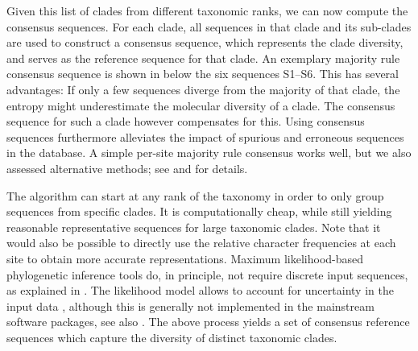 Given this list of clades from different taxonomic ranks, we can now compute the consensus sequences.
For each clade, all sequences in that clade and its sub-clades are used to construct a consensus sequence,
which represents the clade diversity, and serves as the reference sequence for that clade.
An exemplary majority rule consensus sequence is shown in  below the six sequences S1--S6.
This has several advantages:
If only a few sequences diverge from the majority of that clade,
the entropy might underestimate the molecular diversity of a clade.
The consensus sequence for such a clade however compensates for this.
Using consensus sequences furthermore alleviates the impact of spurious and erroneous sequences in the database.
A simple per-site majority rule consensus \cite{May1952,Day1992a} works well,
but we also assessed alternative methods;
see  and  for details.

The algorithm can start at any rank of the taxonomy in order to only group sequences from specific clades.
It is computationally cheap, %
while still yielding reasonable representative sequences for large taxonomic clades.
Note that it would also be possible to directly use the relative character frequencies at each site
to obtain more accurate representations.
Maximum likelihood-based phylogenetic inference tools do, in principle, not require discrete input sequences,
as explained in .
The likelihood model allows to account for uncertainty in the input data \cite{Felsenstein2004},
although this is generally not implemented in the mainstream software packages, see also \cite{Kozlov2018}.
The above process yields a set of consensus reference sequences which capture the diversity of distinct taxonomic clades.



